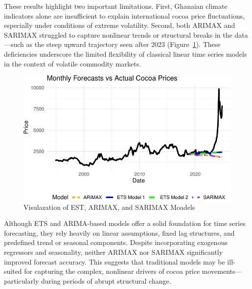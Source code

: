 \documentclass[
  letterpaper,
  DIV=11,
  numbers=noendperiod]{scrartcl}
\begin{document}
These results highlight two important limitations. First, Ghanaian
climate indicators alone are insufficient to explain international cocoa
price fluctuations, especially under conditions of extreme volatility.
Second, both ARIMAX and SARIMAX struggled to capture nonlinear trends or
structural breaks in the data---such as the steep upward trajectory seen
after 2023 (Figure~\ref{fig-plot-sum}). These deficiencies underscore
the limited flexibility of classical linear time series models in the
context of volatile commodity markets.

\begin{table}

\end{table}

\begin{figure}

{\centering \includegraphics{STA457_Project_files/figure-pdf/fig-plot-sum-1.pdf}

}

\caption{\label{fig-plot-sum}Visulazation of EST, ARIMAX, and SARIMAX
Moadels}

\end{figure}

Although ETS and ARIMA-based models offer a solid foundation for time
series forecasting, they rely heavily on linear assumptions, fixed lag
structures, and predefined trend or seasonal components. Despite
incorporating exogenous regressors and seasonality, neither ARIMAX nor
SARIMAX significantly improved forecast accuracy. This suggests that
traditional models may be ill-suited for capturing the complex,
nonlinear drivers of cocoa price movements---particularly during periods
of abrupt structural change.
\end{document}
